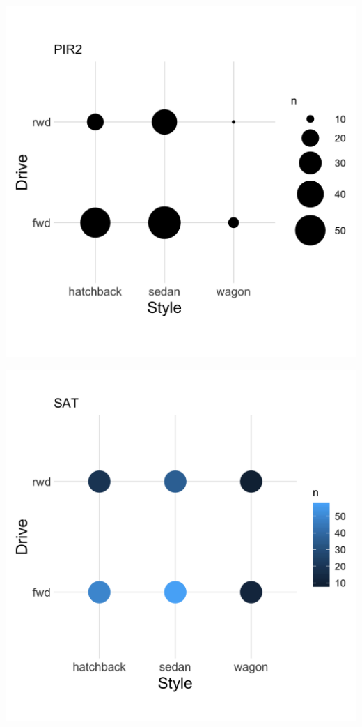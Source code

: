 \documentclass[]{article}
\newcommand{\setwidth}{0.40\textwidth}
\begin{document}
\noindent\hrulefill

\hspace*{\fill}
\begin{minipage}{\setwidth}
  \centering
  \includegraphics[width=1.00\textwidth]{../images/05_area}
\end{minipage} %
\hfill\vline\hfill
\begin{minipage}{\setwidth}
  \centering
  \includegraphics[width=1.00\textwidth]{../images/06_sat}
\end{minipage}
\hspace*{\fill}

\noindent\hrulefill
\end{document}
